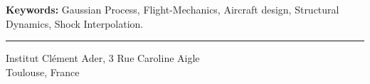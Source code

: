 \begin{vcenterpage}
{\large\textbf{Keywords:}}
    Gaussian Process, Flight-Mechanics, Aircraft design, Structural Dynamics, Shock Interpolation.
\\
\noindent\rule[2pt]{\textwidth}{0.5pt}
\begin{center}
  Institut Cl\'ement Ader, 3 Rue Caroline Aigle\\
  Toulouse, France
\end{center}
\end{vcenterpage}

